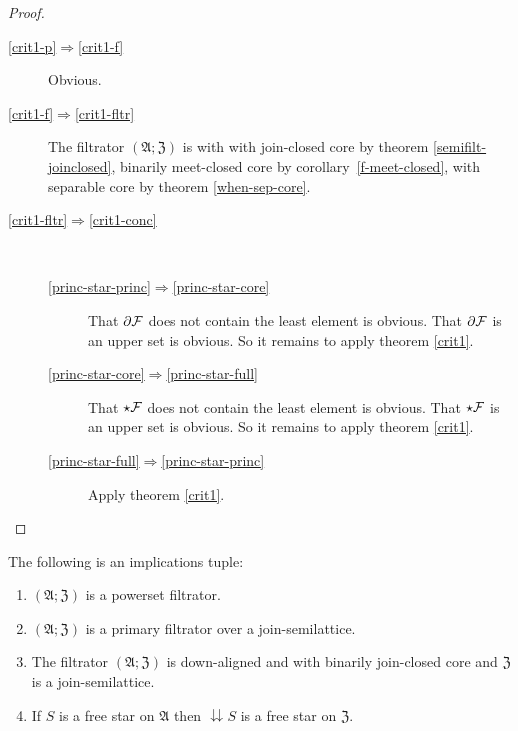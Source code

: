 \begin{proof}
~
\begin{description}
\item [{\ref{crit1-p}$\Rightarrow$\ref{crit1-f}}] Obvious.
\item [{\ref{crit1-f}$\Rightarrow$\ref{crit1-fltr}}] The filtrator $(\mathfrak{A};\mathfrak{Z})$
is with with join-closed core by theorem \ref{semifilt-joinclosed},
binarily meet-closed core by corollary~\ref{f-meet-closed}, with
separable core by theorem \ref{when-sep-core}.
\item [{\ref{crit1-fltr}$\Rightarrow$\ref{crit1-conc}}] ~

\begin{description}
\item [{\ref{princ-star-princ}$\Rightarrow$\ref{princ-star-core}}] That
$\partial\mathcal{F}$ does not contain the least element is obvious.
That $\partial\mathcal{F}$ is an upper set is obvious. So it remains
to apply theorem \ref{crit1}.
\item [{\ref{princ-star-core}$\Rightarrow$\ref{princ-star-full}}] That
$\star\mathcal{F}$ does not contain the least element is obvious.
That $\star\mathcal{F}$ is an upper set is obvious. So it remains
to apply theorem \ref{crit1}.
\item [{\ref{princ-star-full}$\Rightarrow$\ref{princ-star-princ}}] Apply
theorem \ref{crit1}.
\end{description}
\end{description}
\end{proof}
\begin{prop}
The following is an implications tuple:
\begin{enumerate}
\item \label{dfs-p}$(\mathfrak{A};\mathfrak{Z})$ is a powerset filtrator.
\item \label{dfs-f}$(\mathfrak{A};\mathfrak{Z})$ is a primary filtrator
over a join-semilattice.
\item \label{dfs-fltr}The filtrator $(\mathfrak{A};\mathfrak{Z})$ is down-aligned
and with binarily join-closed core and $\mathfrak{Z}$ is a join-semilattice.
\item \label{dfs-conc}If $S$ is a free star on $\mathfrak{A}$ then $\downdownarrows S$
is a free star on $\mathfrak{Z}$.
\end{enumerate}
\end{prop}
